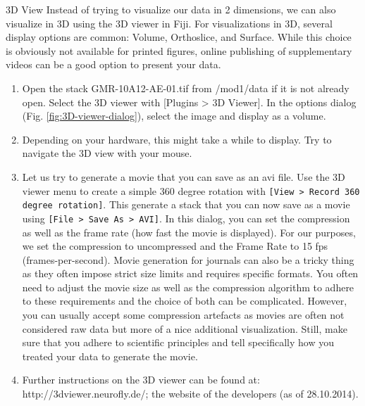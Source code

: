 \newpage
\begin{taskbox}{3D View}
Instead of trying to visualize our data in 2 dimensions, we can also visualize in 3D using the 3D viewer in Fiji. For visualizations in 3D, several display options are common: Volume, Orthoslice, and Surface. While this choice is obviously not available for printed figures, online publishing of supplementary videos can be a good option to present your data.

\begin{enumerate}
	\item Open the stack GMR-10A12-AE-01.tif from /mod1/data if it is not already open. Select the 3D viewer with [Plugins > 3D Viewer]. In the options dialog (Fig. \ref{fig:3D-viewer-dialog}), select the image and display as a volume.	
	
	\begin{minipage}[t]{\linewidth}
		\begin{center}
		\medskip
		\label{fig:3D-viewer-dialog}
		\end{center}
	\end{minipage}
	
	\item Depending on your hardware, this might take a while to display. Try to navigate the 3D view with your mouse. 
	\item Let us try to generate a movie that you can save as an avi file. Use the 3D viewer menu to create a simple 360 degree rotation with \texttt{[View > Record 360 degree rotation]}. This generate a stack that you can now save as a movie using \texttt{[File > Save As > AVI]}. In this dialog, you can set the compression as well as the frame rate (how fast the movie is displayed). For our purposes, we set the compression to uncompressed and the Frame Rate to 15 fps (frames-per-second). Movie generation for journals can also be a tricky thing as they often impose strict size limits and requires specific formats. You often need to adjust the movie size as well as the compression algorithm to adhere to these requirements and the choice of both can be complicated. However, you can usually accept some compression artefacts as movies are often not considered raw data but more of a nice additional visualization. Still, make sure that you adhere to scientific principles and tell specifically how you treated your data to generate the movie.
	\item Further instructions on the 3D viewer can be found at: http://3dviewer.neurofly.de/; the website of the developers (as of 28.10.2014).
\end{enumerate}


\end{taskbox}
